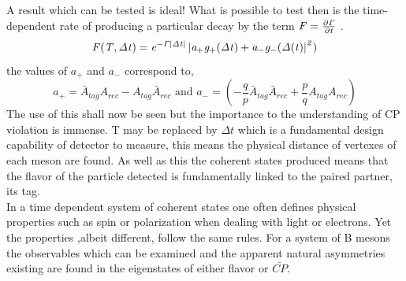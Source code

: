 A result which can be tested is ideal! What is possible to test then is the time-dependent rate of producing a particular decay by the term $\it{F}=\frac{\partial\Gamma}{\partial t}$ \cite{CKM5}. 
\begin{equation}\label{BPME13}
\it{F}(T,\Delta t)=e^{-\Gamma\left|\Delta t\right|}\left| a_{+}g_{+}(\Delta t)+ a_{-}g_{-}(\Delta (t) \right|^{2})
\end{equation}
the values of $a_+$ and $a_-$ correspond to,
\begin{equation}\label{BPME14}
 a_{+}=\bar{A}_{tag}A_{rec}-A_{tag}\bar{A}_{rec} \mbox{ and }a_{-}=\left(-\frac{q}{p}\bar{A}_{tag}\bar{A}_{rec}+\frac{p}{q}A_{tag}A_{rec}\right)
\end{equation}
The use of this shall now be seen but the importance to the understanding of CP violation is immense. T may be replaced by $\Delta t$ which is a fundamental design capability of detector to measure, this means the physical distance of vertexes of each meson are found. As well as this the coherent states produced means that the flavor of the particle detected is fundamentally linked to the paired partner, its tag.
\\

In a time dependent system of coherent states one often defines physical properties such as spin or polarization when dealing with light or electrons. Yet the properties ,albeit different, follow the same rules. For a system of B mesons the observables which can be examined and the apparent natural asymmetries existing are found in the eigenstates of either flavor or $\bar{CP}$. 

